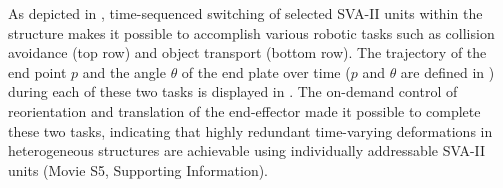 As depicted in ,  time-sequenced switching of selected SVA-II units within the structure makes it possible to accomplish various robotic tasks such as collision avoidance (top row) and object transport (bottom row).
The trajectory of the end point $p$ and the angle $\theta$ of the end plate over time ($p$ and $\theta$ are defined in ) during each of these two tasks %
is displayed  in . The on-demand control of reorientation and translation of the end-effector made it possible to complete these two tasks, %
indicating that highly redundant time-varying deformations in heterogeneous structures are achievable using individually addressable SVA-II units (Movie S5, Supporting Information).
